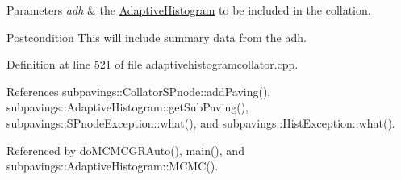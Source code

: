 \begin{DoxyParams}{\-Parameters}
{\em adh} & the \hyperlink{classsubpavings_1_1AdaptiveHistogram}{\-Adaptive\-Histogram} to be included in the collation. \\
\hline
\end{DoxyParams}
\begin{DoxyPostcond}{\-Postcondition}
\-This will include summary data from the adh. 
\end{DoxyPostcond}


\-Definition at line 521 of file adaptivehistogramcollator.\-cpp.



\-References subpavings\-::\-Collator\-S\-Pnode\-::add\-Paving(), subpavings\-::\-Adaptive\-Histogram\-::get\-Sub\-Paving(), subpavings\-::\-S\-Pnode\-Exception\-::what(), and subpavings\-::\-Hist\-Exception\-::what().



\-Referenced by do\-M\-C\-M\-C\-G\-R\-Auto(), main(), and subpavings\-::\-Adaptive\-Histogram\-::\-M\-C\-M\-C().


